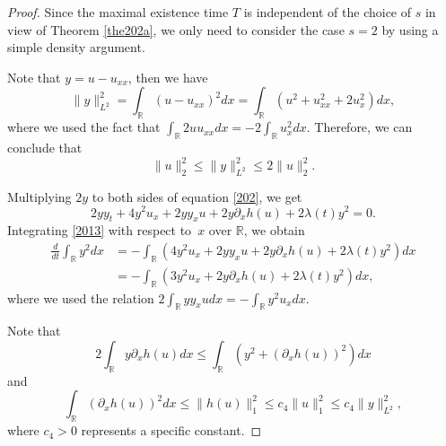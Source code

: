 \documentclass[preprint,12pt]{elsarticle}
\numberwithin{equation}{section}
\begin{document}
\begin{proof}
Since the maximal existence time $T$ is independent of the choice of $s$ in view of Theorem \ref{the202a}, we only need to consider the case $s=2$ by using a simple density argument.


Note that $y=u-u_{xx}$, then we have
\begin{equation*}
\|y\|_{L^{2}}^{2}=\int_{\mathbb{R}}(u-u_{xx})^{2}dx=\int_{\mathbb{R}}(u^{2}+u_{xx}^{2}+2u_{x}^{2})dx,
\end{equation*}
where we used the fact that
$
\int_{\mathbb{R}}2uu_{xx}dx
=-2\int_{\mathbb{R}}u_{x}^{2}dx.
$
Therefore, we can conclude that
\begin{equation}
\|u\|_{2}^{2}\leq\|y\|_{L^{2}}^{2}\leq 2\|u\|_{2}^{2}.
\label{2012}
\end{equation}

Multiplying $2y$ to both sides of equation \eqref{202}, we get
\begin{equation}
2yy_{t}+4y^{2} u_{x}+2yy_{x}u+2y\partial_{x}h(u)+2\lambda(t) y^{2}=0.
\label{2013}
\end{equation}
Integrating \eqref{2013} with respect to\ $x$ over $\mathbb{R}$, we obtain
\begin{align}
\frac{d}{dt}\int_{\mathbb{R}}y^{2}dx&=-\int_{\mathbb{R}}(4y^{2} u_{x}+2yy_{x}u+2y\partial_{x}h(u)+2\lambda(t) y^{2})dx\nonumber\\
&=-\int_{\mathbb{R}}(3y^{2} u_{x}+2y\partial_{x}h(u)+2\lambda(t) y^{2})dx,
\label{2014}
\end{align}
where we used the relation
$
2\int_{\mathbb{R}}yy_{x}udx=-\int_{\mathbb{R}}y^{2}u_{x}dx.
$

Note that
$$2\int_{\mathbb{R}}y\partial_{x}h(u)dx\leq \int_{\mathbb{R}}(y^{2}+(\partial_{x}h(u))^{2})dx$$
and
$$\int_{\mathbb{R}}(\partial_{x}h(u))^{2}dx\leq \|h(u)\|_{1}^{2}\leq c_{4}\|u\|_{1}^{2}\leq c_{4}\|y\|_{L^{2}}^{2},$$
where $c_{4}>0$ represents a specific constant.


\end{proof}
\end{document}
